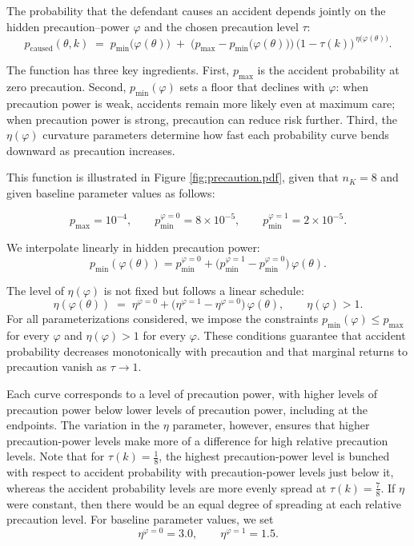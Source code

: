 \documentclass{article}
\begin{document}
The probability that the defendant causes an accident depends jointly on the hidden precaution–power $\varphi$ and the chosen precaution level $\tau$:
\[
p_{\mathrm{caused}}(\theta,k)
\;=\;
p_{\min}\!\bigl(\varphi(\theta)\bigr)
\;+\;
\bigl(p_{\max}-p_{\min}\!\bigl(\varphi(\theta)\bigr)\bigr)\,
\bigl(1-\tau(k)\bigr)^{\,\eta\!\bigl(\varphi(\theta)\bigr)}.
\]

The function has three key ingredients. First, $p_{\max}$ is the accident probability at zero precaution. Second, $p_{\min}(\varphi)$ sets a floor that declines with $\varphi$: when precaution power is weak, accidents remain more likely even at maximum care; when precaution power is strong, precaution can reduce risk further. Third, the  $\eta(\varphi)$ curvature parameters determine how fast each probability curve bends downward as precaution increases.

This function is illustrated in Figure \ref{fig:precaution.pdf}, given that $n_K = 8$ and given baseline parameter values as follows:

\[
p_{\max}=10^{-4}, \qquad 
p_{\min}^{\varphi=0}=8\times 10^{-5}, \qquad 
p_{\min}^{\varphi=1}=2\times 10^{-5}.
\]

We interpolate linearly in hidden precaution power:
\[
p_{\min}(\varphi(\theta)) = p_{\min}^{\varphi=0} +
\bigl(p_{\min}^{\varphi=1}-p_{\min}^{\varphi=0}\bigr)\,\varphi(\theta).
\]

The level of $\eta(\varphi)$ is not fixed but follows a linear schedule:
\[
\eta(\varphi(\theta)) \;=\; \eta^{\varphi=0} + 
\bigl(\eta^{\varphi=1}-\eta^{\varphi=0}\bigr)\,\varphi(\theta),
\qquad \eta(\varphi) > 1.
\]
For all parameterizations considered, we impose the constraints $p_{\min}(\varphi) \leq p_{\max}$ for every $\varphi$ and $\eta(\varphi) > 1$ for every $\varphi$. These conditions guarantee that accident probability decreases monotonically with precaution and that marginal returns to precaution vanish as $\tau \to 1$.

Each curve corresponds to a level of precaution power, with higher levels of precaution power below lower levels of precaution power, including at the endpoints. The variation in the $\eta$ parameter, however, ensures that higher precaution-power levels make more of a difference for high relative precaution levels. Note that for $\tau(k) = \tfrac{1}{8}$, the highest precaution-power level is bunched with respect to accident probability with precaution-power levels just below it, whereas the accident probability levels are more evenly spread at $\tau(k) = \tfrac{7}{8}$. If $\eta$ were constant, then there would be an equal degree of spreading at each relative precaution level. For baseline parameter values, we set
\[
\eta^{\varphi=0}=3.0, \qquad \eta^{\varphi=1}=1.5.
\]
\end{document}
